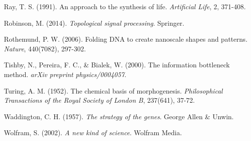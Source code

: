 \documentclass[11pt]{article}
\begin{document}
\begin{thebibliography}{99}
Ray, T. S. (1991).
\newblock An approach to the synthesis of life.
\newblock \textit{Artificial Life}, 2, 371-408.

Robinson, M. (2014).
\newblock \textit{Topological signal processing}.
\newblock Springer.

Rothemund, P. W. (2006).
\newblock Folding DNA to create nanoscale shapes and patterns.
\newblock \textit{Nature}, 440(7082), 297-302.

Tishby, N., Pereira, F. C., \& Bialek, W. (2000).
\newblock The information bottleneck method.
\newblock \textit{arXiv preprint physics/0004057}.

Turing, A. M. (1952).
\newblock The chemical basis of morphogenesis.
\newblock \textit{Philosophical Transactions of the Royal Society of London B}, 237(641), 37-72.

Waddington, C. H. (1957).
\newblock \textit{The strategy of the genes}.
\newblock George Allen \& Unwin.

Wolfram, S. (2002).
\newblock \textit{A new kind of science}.
\newblock Wolfram Media.

\end{thebibliography}
\end{document}
